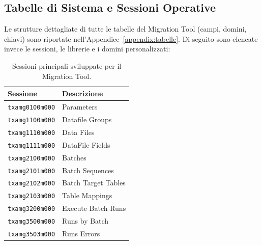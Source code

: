 \subsection{Tabelle di Sistema e Sessioni Operative}\label{subsec:tabelle-di-sistema-e-sessioni-operative}

Le strutture dettagliate di tutte le tabelle del Migration Tool (campi, domini, chiavi) sono riportate nell'Appendice~\ref{appendix:tabelle}.
Di seguito sono elencate invece le sessioni, le librerie e i domini personalizzati:

\begin{table}[H]
    \centering
    \begin{tabular}{l p{9cm}}
        \toprule
        \textbf{Sessione} & \textbf{Descrizione} \\
        \midrule
        \texttt{txamg0100m000} & Parameters \\
        \texttt{txamg1100m000} & Datafile Groups \\
        \texttt{txamg1110m000} & Data Files \\
        \texttt{txamg1111m000} & DataFile Fields \\
        \texttt{txamg2100m000} & Batches \\
        \texttt{txamg2101m000} & Batch Sequences \\
        \texttt{txamg2102m000} & Batch Target Tables \\
        \texttt{txamg2103m000} & Table Mappings \\
        \texttt{txamg3200m000} & Execute Batch Runs \\
        \texttt{txamg3500m000} & Runs by Batch \\
        \texttt{txamg3503m000} & Runs Errors \\
        \bottomrule
    \end{tabular}
    \caption{Sessioni principali sviluppate per il Migration Tool.}
    \label{tab:sessioni}
\end{table}

